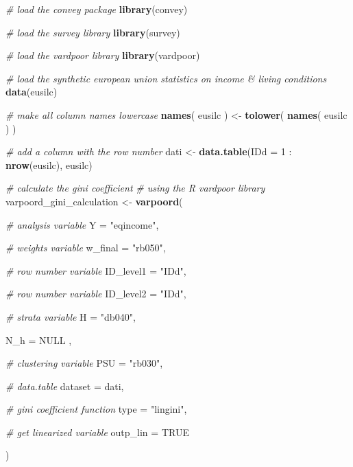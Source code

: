 \documentclass[]{book}
\newenvironment{Shaded}{\begin{snugshade}}{\end{snugshade}}
\newcommand{\KeywordTok}[1]{\textcolor[rgb]{0.13,0.29,0.53}{\textbf{{#1}}}}
\newcommand{\DataTypeTok}[1]{\textcolor[rgb]{0.13,0.29,0.53}{{#1}}}
\newcommand{\DecValTok}[1]{\textcolor[rgb]{0.00,0.00,0.81}{{#1}}}
\newcommand{\StringTok}[1]{\textcolor[rgb]{0.31,0.60,0.02}{{#1}}}
\newcommand{\CommentTok}[1]{\textcolor[rgb]{0.56,0.35,0.01}{\textit{{#1}}}}
\newcommand{\OtherTok}[1]{\textcolor[rgb]{0.56,0.35,0.01}{{#1}}}
\newcommand{\NormalTok}[1]{{#1}}
\theoremstyle{definition}
\theoremstyle{definition}
\theoremstyle{remark}
\begin{document}
\begin{Shaded}
\begin{Highlighting}[]
\CommentTok{# load the convey package}
\KeywordTok{library}\NormalTok{(convey)}

\CommentTok{# load the survey library}
\KeywordTok{library}\NormalTok{(survey)}

\CommentTok{# load the vardpoor library}
\KeywordTok{library}\NormalTok{(vardpoor)}

\CommentTok{# load the synthetic european union statistics on income & living conditions}
\KeywordTok{data}\NormalTok{(eusilc)}

\CommentTok{# make all column names lowercase}
\KeywordTok{names}\NormalTok{( eusilc ) <-}\StringTok{ }\KeywordTok{tolower}\NormalTok{( }\KeywordTok{names}\NormalTok{( eusilc ) )}

\CommentTok{# add a column with the row number}
\NormalTok{dati <-}\StringTok{ }\KeywordTok{data.table}\NormalTok{(}\DataTypeTok{IDd =} \DecValTok{1} \NormalTok{:}\StringTok{ }\KeywordTok{nrow}\NormalTok{(eusilc), eusilc)}

\CommentTok{# calculate the gini coefficient}
\CommentTok{# using the R vardpoor library}
\NormalTok{varpoord_gini_calculation <-}
\StringTok{    }\KeywordTok{varpoord}\NormalTok{(}
    
        \CommentTok{# analysis variable}
        \DataTypeTok{Y =} \StringTok{"eqincome"}\NormalTok{, }
        
        \CommentTok{# weights variable}
        \DataTypeTok{w_final =} \StringTok{"rb050"}\NormalTok{,}
        
        \CommentTok{# row number variable}
        \DataTypeTok{ID_level1 =} \StringTok{"IDd"}\NormalTok{,}
        
        \CommentTok{# row number variable}
        \DataTypeTok{ID_level2 =} \StringTok{"IDd"}\NormalTok{,}
        
        \CommentTok{# strata variable}
        \DataTypeTok{H =} \StringTok{"db040"}\NormalTok{, }
        
        \DataTypeTok{N_h =} \OtherTok{NULL} \NormalTok{,}
        
        \CommentTok{# clustering variable}
        \DataTypeTok{PSU =} \StringTok{"rb030"}\NormalTok{, }
        
        \CommentTok{# data.table}
        \DataTypeTok{dataset =} \NormalTok{dati, }
        
        \CommentTok{# gini coefficient function}
        \DataTypeTok{type =} \StringTok{"lingini"}\NormalTok{,}
      
      \CommentTok{# get linearized variable}
      \DataTypeTok{outp_lin =} \OtherTok{TRUE}
        
    \NormalTok{)}
\end{Highlighting}
\end{Shaded}
\end{document}
